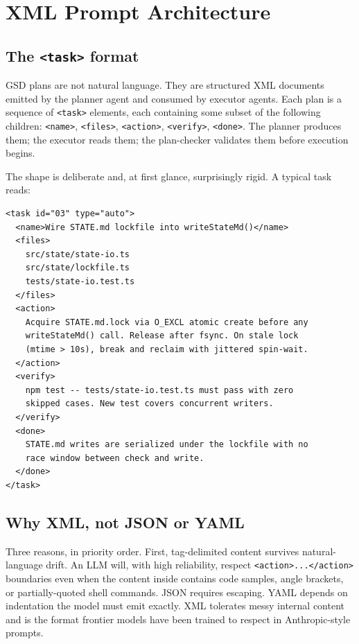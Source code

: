 \documentclass[11pt,letterpaper,openany]{book}
\begin{document}
\chapter{XML Prompt Architecture}

\section{The \texttt{<task>} format}

GSD plans are not natural language. They are structured XML documents emitted by the planner agent and consumed by executor agents. Each plan is a sequence of \texttt{<task>} elements, each containing some subset of the following children: \texttt{<name>}, \texttt{<files>}, \texttt{<action>}, \texttt{<verify>}, \texttt{<done>}. The planner produces them; the executor reads them; the plan-checker validates them before execution begins.

The shape is deliberate and, at first glance, surprisingly rigid. A typical task reads:

\begin{lstlisting}
<task id="03" type="auto">
  <name>Wire STATE.md lockfile into writeStateMd()</name>
  <files>
    src/state/state-io.ts
    src/state/lockfile.ts
    tests/state-io.test.ts
  </files>
  <action>
    Acquire STATE.md.lock via O_EXCL atomic create before any
    writeStateMd() call. Release after fsync. On stale lock
    (mtime > 10s), break and reclaim with jittered spin-wait.
  </action>
  <verify>
    npm test -- tests/state-io.test.ts must pass with zero
    skipped cases. New test covers concurrent writers.
  </verify>
  <done>
    STATE.md writes are serialized under the lockfile with no
    race window between check and write.
  </done>
</task>
\end{lstlisting}

\section{Why XML, not JSON or YAML}

Three reasons, in priority order. First, tag-delimited content survives natural-language drift. An LLM will, with high reliability, respect \texttt{<action>...</action>} boundaries even when the content inside contains code samples, angle brackets, or partially-quoted shell commands. JSON requires escaping. YAML depends on indentation the model must emit exactly. XML tolerates messy internal content and is the format frontier models have been trained to respect in Anthropic-style prompts.
\end{document}
